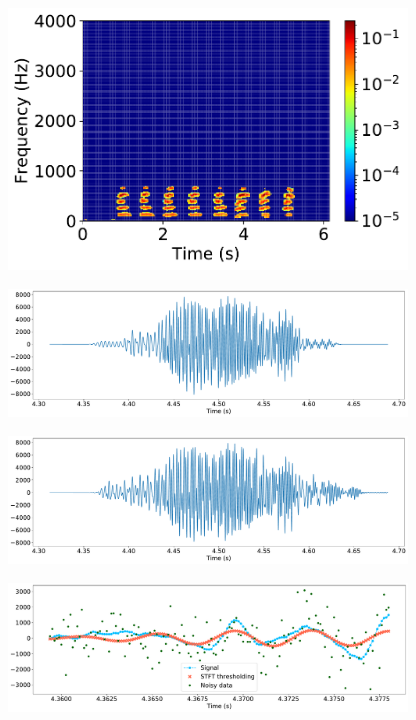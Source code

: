 \documentclass[12pt,twoside]{article}
\begin{document}
\begin{enumerate}
\begin{figure}[H]
	\end{figure}
	\begin{figure}[H]
		\centering
		\captionsetup{justification=centering}
        		\includegraphics[width=300pt]{code/STFT/plots/stft_denoising__block_denoised_0_stft}
	\end{figure}
	\begin{figure}[H]
		\centering
		\captionsetup{justification=centering}
        		\includegraphics[width=300pt]{code/STFT/plots/stft_stft_denoised_0}
	\end{figure}
	\begin{figure}[H]
		\centering
		\captionsetup{justification=centering}
        		\includegraphics[width=300pt]{code/STFT/plots/stft_block_denoised_0}
	\end{figure}
	\begin{figure}[H]
		\centering
		\captionsetup{justification=centering}
        		\includegraphics[width=300pt]{code/STFT/plots/stft_stft_denoised_0_zoom}

\end{figure}
\end{enumerate}
\end{document}
